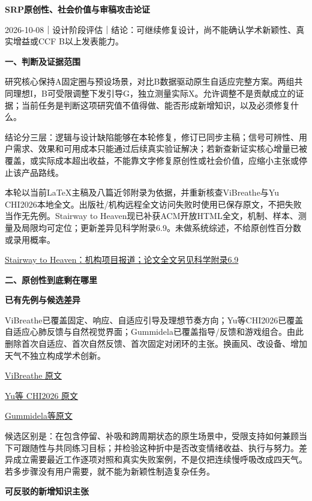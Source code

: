 \documentclass[11pt,a4paper]{article}
\newcommand{\reviewtitle}[1]{\begin{center}{\titlelatin\titlecjk\bfseries\fontsize{21}{28}\selectfont #1}\end{center}\vspace{8pt}}
\newcommand{\reviewsection}[1]{\par\Needspace{9\baselineskip}\vspace{10pt}\begin{center}{\titlelatin\titlecjk\bfseries\fontsize{14}{20}\selectfont #1}\end{center}}
\newcommand{\reviewsubsection}[1]{\par\Needspace{4\baselineskip}\vspace{4pt}\begin{center}{\titlelatin\titlecjk\bfseries\fontsize{12}{18}\selectfont #1}\end{center}}
\begin{document}
\reviewtitle{SRP原创性、社会价值与审稿攻击论证}

2026-\allowbreak{}10-\allowbreak{}08｜设计阶段评估｜结论：可继续修复设计，尚不能确认学术新颖性、真实增益或CCF B以上发表能力。

\reviewsection{一、判断及证据范围}

研究核心保持A固定圈与预设场景，对比B数据驱动原生自适应完整方案。两组共同理想I，B可受限调整下发引导G，独立测量实际X。允许调整不是贡献成立的证据；当前任务是判断这项研究值不值得做、能否形成新增知识，以及必须修复什么。


结论分三层：逻辑与设计缺陷能够在本轮修复，修订已同步主稿；信号可辨性、用户需求、效果和可用成本只能通过后续真实验证解决；若新查新证实核心增量已被覆盖，或实际成本超出收益，不能靠文字修复原创性或社会价值，应缩小主张或停止该产品路线。


本轮以当前LaTeX主稿及八篇近邻附录为依据，并重新核查ViBreathe与Yu CHI2026本地全文。出版社/\allowbreak{}机构远程全文访问失败时使用已保存原文，不把失败当作无先例。Stairway to Heaven现已补获ACM开放HTML全文，机制、样本、测量及局限均可定位；更新差异见科学附录6.9。未做系统综述，不给原创性百分数或录用概率。


\href{https://news.northeastern.edu/2024/09/02/meditation-game-stairway-to-heaven/}{Stairway to Heaven：机构项目报道；论文全文另见科学附录6.9}

\reviewsection{二、原创性到底剩在哪里}

\reviewsubsection{2.1 已有先例与候选差异}

ViBreathe已覆盖固定、响应、自适应引导及理想节奏方向；Yu等CHI2026已覆盖自适应心肺反馈与自然视觉界面；Gummidela已覆盖指导/\allowbreak{}反馈和游戏组合。由此删除首次自适应、首次自然反馈、首次固定对闭环的主张。换画风、改设备、增加天气不独立构成学术创新。


\href{https://research.chalmers.se/publication/523202/file/523202_Fulltext.pdf}{ViBreathe 原文}

\href{https://pi.cs.tsinghua.edu.cn/wp-content/uploads/2026/04/3772318.3790488.pdf}{Yu等 CHI2026 原文}

\href{https://www.frontiersin.org/journals/digital-health/articles/10.3389/fdgth.2021.760268/full}{Gummidela等原文}

候选区别是：在包含停留、补吸和跨周期状态的原生场景中，受限支持如何兼顾当下可跟随性与共同练习目标；并检验这种折中是否改变情绪收益、执行与努力。差异成立需要最近工作逐项对照和真实失败案例，不是仅把连续慢呼吸改成四天气。若多步骤没有用户需要，就不能为新颖性制造复杂任务。


\reviewsubsection{2.2 可反驳的新增知识主张}
\end{document}
